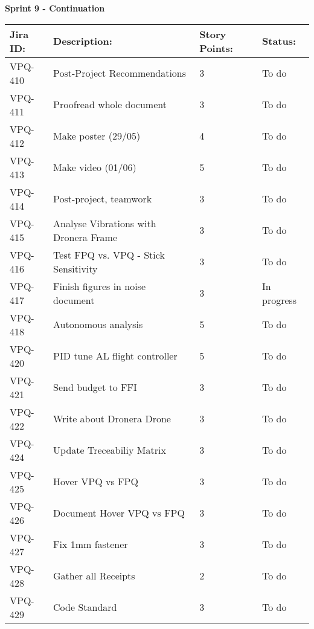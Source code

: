 \begin{table}[ht]
\centering\textbf{Sprint 9 - Continuation}
\begin{tabularx}{\linewidth}{|m{1.5cm} m{8.3cm} m{1.5cm} m{3.5cm}|}
\hline
    \rowcolor{cadetgrey} 
     \textbf{Jira ID:} & \textbf{Description:} &  \textbf{Story Points:} & \textbf{Status: } \\ \hline
      VPQ-410 & Post-Project Recommendations & 3\centering & To do  \\ 
\rowcolor{gainsboro} VPQ-411 & Proofread whole document & 3\centering & To do  \\
      VPQ-412 & Make poster (29/05) & 4\centering & To do  \\
\rowcolor{gainsboro} VPQ-413 & Make video (01/06) & 5\centering & To do  \\
      VPQ-414 & Post-project, teamwork & 3\centering & To do  \\
\rowcolor{gainsboro} VPQ-415 & Analyse Vibrations with Dronera Frame & 3\centering & To do  \\
      VPQ-416 & Test FPQ vs. VPQ - Stick Sensitivity & 3\centering & To do  \\
\rowcolor{gainsboro} VPQ-417 & Finish figures in noise document & 3\centering & In progress  \\    
      VPQ-418 & Autonomous analysis  & 5\centering & To do  \\
\rowcolor{gainsboro}  VPQ-420 & PID tune AL flight controller & 5\centering & To do  \\
      VPQ-421 & Send budget to FFI & 3\centering & To do  \\
\rowcolor{gainsboro}  VPQ-422 & Write about Dronera Drone & 3\centering & To do  \\
      VPQ-424 & Update Treceabiliy Matrix & 3\centering & To do  \\
\rowcolor{gainsboro}  VPQ-425 & Hover VPQ vs FPQ & 3\centering & To do  \\
      VPQ-426 & Document Hover VPQ vs FPQ & 3\centering & To do  \\
\rowcolor{gainsboro}  VPQ-427 & Fix 1mm fastener & 3\centering & To do  \\
      VPQ-428 & Gather all Receipts & 2\centering & To do  \\
\rowcolor{gainsboro}  VPQ-429 & Code Standard & 3\centering & To do  \\
\hline    
\end{tabularx}
\end{table}









